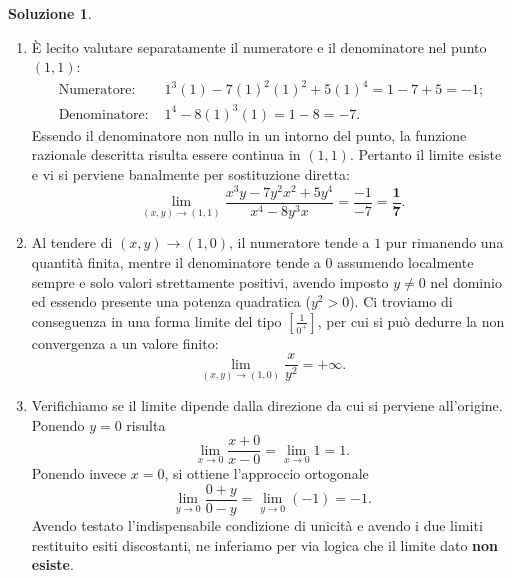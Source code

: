 \documentclass[12pt,a4paper]{article}
\theoremstyle{definition}
\newtheorem{sol}{Soluzione}
\begin{document}
\begin{sol}
    \begin{enumerate}
        \item È lecito valutare separatamente il numeratore e il denominatore nel punto $(1,1)$:
              \begin{align*}
                  \text{Numeratore: }   & 1^3(1) - 7(1)^2(1)^2 + 5(1)^4 = 1 - 7 + 5 = -1; \\
                  \text{Denominatore: } & 1^4 - 8(1)^3(1) = 1 - 8 = -7.
              \end{align*}
              Essendo il denominatore non nullo in un intorno del punto, la funzione razionale descritta risulta essere continua in $(1,1)$. Pertanto il limite esiste e vi si perviene banalmente per sostituzione diretta:
              \[ \lim_{(x,y) \to (1,1)} \frac{x^3y - 7y^2x^2 + 5y^4}{x^4 - 8y^3x} = \frac{-1}{-7} = \mathbf{\frac{1}{7}}. \]
        \item Al tendere di $(x,y) \to (1,0)$, il numeratore tende a $1$ pur rimanendo una quantità finita, mentre il denominatore tende a $0$ assumendo localmente sempre e solo valori strettamente positivi, avendo imposto $y \ne 0$ nel dominio ed essendo presente una potenza quadratica ($y^2 > 0$). Ci troviamo di conseguenza in una forma limite del tipo $\left[ \frac{1}{0^+} \right]$, per cui si può dedurre la non convergenza a un valore finito:
              \[ \lim_{(x,y) \to (1,0)} \frac{x}{y^2} = \boldsymbol{+\infty}. \]
        \item Verifichiamo se il limite dipende dalla direzione da cui si perviene all'origine. Ponendo $y=0$ risulta
              \[ \lim_{x \to 0} \frac{x+0}{x-0} = \lim_{x \to 0} 1 = 1. \]
              Ponendo invece $x=0$, si ottiene l'approccio ortogonale
              \[ \lim_{y \to 0} \frac{0+y}{0-y} = \lim_{y \to 0} (-1) = -1. \]
              Avendo testato l'indispensabile condizione di unicità e avendo i due limiti restituito esiti discostanti, ne inferiamo per via logica che il limite dato \textbf{non esiste}.
    \end{enumerate}
\end{sol}
\end{document}
